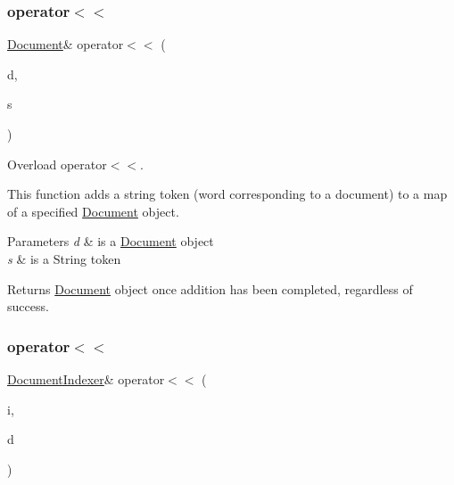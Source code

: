\subsubsection{\texorpdfstring{operator$<$$<$}{operator<<}\hspace{0.1cm}{\footnotesize\ttfamily [1/4]}}
{\footnotesize\ttfamily \hyperlink{class_document}{Document}\& operator$<$$<$ (\begin{DoxyParamCaption}\item[{\hyperlink{class_document}{Document} \&}]{d,  }\item[{const std\+::string \&}]{s }\end{DoxyParamCaption})\hspace{0.3cm}{\ttfamily [friend]}}



Overload operator$<$$<$. 

This function adds a string token (word corresponding to a document) to a map of a specified \hyperlink{class_document}{Document} object.


\begin{DoxyParams}{Parameters}
{\em d} & is a \hyperlink{class_document}{Document} object \\
\hline
{\em s} & is a String token \\
\hline
\end{DoxyParams}
\begin{DoxyReturn}{Returns}
\hyperlink{class_document}{Document} object once addition has been completed, regardless of success. 
\end{DoxyReturn}
\mbox{\label{class_document_a6c2e084b73080867237d1637bc040d66}} 
\subsubsection{\texorpdfstring{operator$<$$<$}{operator<<}\hspace{0.1cm}{\footnotesize\ttfamily [2/4]}}
{\footnotesize\ttfamily \hyperlink{class_document_indexer}{Document\+Indexer}\& operator$<$$<$ (\begin{DoxyParamCaption}\item[{\hyperlink{class_document_indexer}{Document\+Indexer} \&}]{i,  }\item[{const \hyperlink{class_document}{Document} \&}]{d }\end{DoxyParamCaption})\hspace{0.3cm}{\ttfamily [friend]}}


